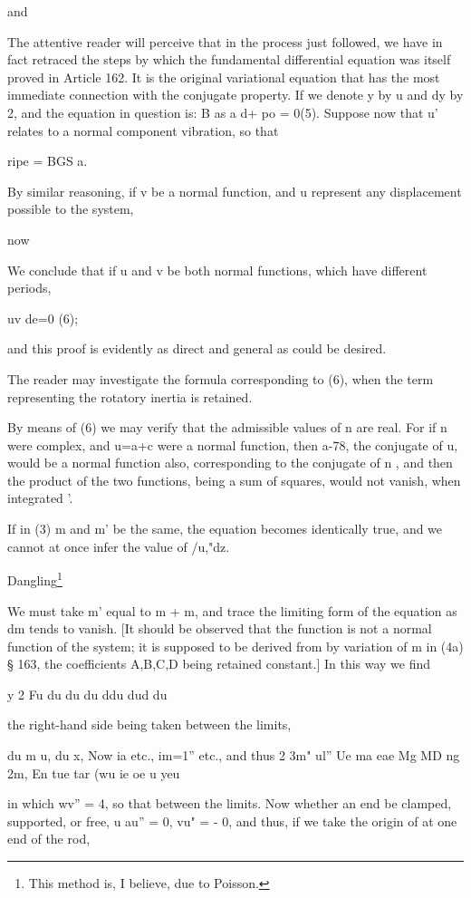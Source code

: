 and

The attentive reader will perceive that in the process just followed, we
have in fact retraced the steps by which the fundamental differential
equation was itself proved in Article 162. It is the
original variational equation that has the most immediate connection
with the conjugate property. If we denote y by u and dy
by 2, and the equation in question is:
B as a d+ po = 0(5).
Suppose now
that u' relates to a normal component vibration, so that

ripe = BGS a.

By similar reasoning, if v be a normal function, and u represent any
displacement possible to the system,

now

We conclude that if u and v be both normal functions, which have
different periods,

uv de=0 (6);

and this proof is evidently as direct and general as could be desired.

The reader may investigate the formula corresponding to (6), when the
term representing the rotatory inertia is retained.

By means of (6) we may verify that the admissible values of n are real.
For if n were complex, and u=a+c were a normal function, then a-78, the
conjugate of u, would be a normal function also, corresponding to the
conjugate of n , and then the product of the two functions, being a sum
of squares, would not vanish, when integrated '.

If in (3) m and m' be the same, the equation becomes identically true,
and we cannot at once infer the value of /u,"dz.

Dangling\footnote{ This method is, I believe, due to Poisson.}

We must take m' equal to m + m, and trace the limiting form of
the equation as dm tends to vanish.
[It should be observed that the function is not a normal function of the system;
it is supposed to be derived from by variation of m in (4a) § 163,
the coefficients A,B,C,D being retained constant.]
In this way we find

y 2 Fu du du du ddu dud du

the right-hand side being taken between the limits,

du m u, du x, Now ia etc., im=1'' etc., and thus 2 3m" ul'' Ue ma eae Mg
MD ng 2m, En tue tar (wu ie oe u yeu

in which wv'' = 4, so that between the limits. Now whether an end be clamped,
supported, or free, u au'' = 0, vu" = - 0,
and thus, if we take the origin of at one end of the rod,

